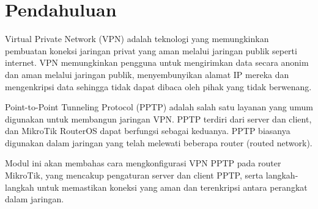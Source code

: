 \section*{Pendahuluan}

Virtual Private Network (VPN) adalah teknologi yang memungkinkan pembuatan koneksi jaringan privat yang aman melalui jaringan publik seperti internet. VPN memungkinkan pengguna untuk mengirimkan data secara anonim dan aman melalui jaringan publik, menyembunyikan alamat IP mereka dan mengenkripsi data sehingga tidak dapat dibaca oleh pihak yang tidak berwenang.

Point-to-Point Tunneling Protocol (PPTP) adalah salah satu layanan yang umum digunakan untuk membangun jaringan VPN. PPTP terdiri dari server dan client, dan MikroTik RouterOS dapat berfungsi sebagai keduanya. PPTP biasanya digunakan dalam jaringan yang telah melewati beberapa router (routed network).

Modul ini akan membahas cara mengkonfigurasi VPN PPTP pada router MikroTik, yang mencakup pengaturan server dan client PPTP, serta langkah-langkah untuk memastikan koneksi yang aman dan terenkripsi antara perangkat dalam jaringan.